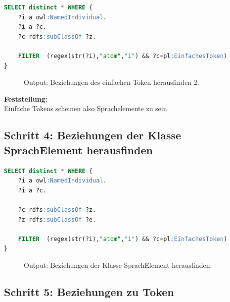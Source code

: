 \begin{lstlisting}[caption={Beziehungen des einfachen Token herausfinden 2},captionpos=b,language=SQL]
SELECT distinct * WHERE { 
	?i a owl:NamedIndividual.
	?i a ?c.
	?c rdfs:subClassOf ?z.
	
	FILTER  (regex(str(?i),"atom","i") && ?c=pl:EinfachesToken)
}

\end{lstlisting}

\begin{figure}[H]
\centering {}
\caption{Output: Beziehungen des einfachen Token herausfinden 2.\label{fig:atom_3_b}\protect\footnotemark}
\end{figure}

\textbf{Feststellung:}\\  Einfache Tokens scheinen also Sprachelemente zu sein.

\subsection{Schritt 4: Beziehungen der Klasse SprachElement herausfinden}
\label{ssec:anh_beispiel_f_4}

\begin{lstlisting}[caption={Beziehungen der Klasse SprachElement herausfinden},captionpos=b,language=SQL]
SELECT distinct * WHERE { 
	?i a owl:NamedIndividual.
	?i a ?c.

	?c rdfs:subClassOf ?z.
	?z rdfs:subClassOf ?e.
	
	FILTER  (regex(str(?i),"atom","i") && ?c=pl:EinfachesToken)
}
\end{lstlisting}

\begin{figure}[H]
\centering {}
\caption{Output: Beziehungen der Klasse SprachElement herausfinden.\label{fig:atom_4}\protect\footnotemark}
\end{figure}

\subsection{Schritt 5: Beziehungen zu Token}
\label{ssec:anh_beispiel_f_5}

